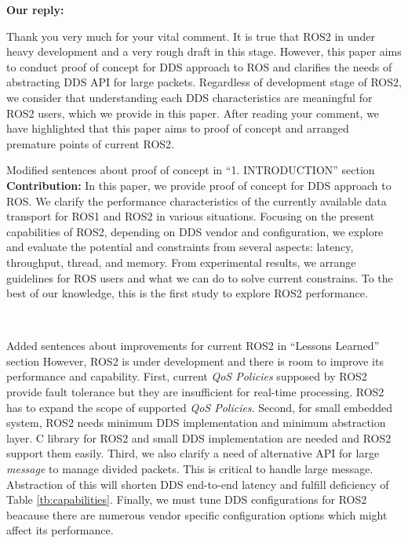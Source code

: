 \documentclass{article}
\begin{document}
\begin{itemize}
  \begin{flushleft}
    \textbf{Our reply:}
  \end{flushleft}
  Thank you very much for your vital comment.
  It is true that ROS2 in under heavy development and a very rough draft in this stage.
  However, this paper aims to conduct proof of concept for DDS approach to ROS and clarifies the needs of abstracting DDS API for large packets.
  Regardless of development stage of ROS2, we consider that understanding each DDS characteristics are meaningful for ROS2 users, which we provide in this paper.
  After reading your comment, we have highlighted that this paper aims to proof of concept and arranged premature points of current ROS2.
  \begin{itembox}[|]{Modified sentences about proof of concept in ``1. INTRODUCTION'' section}
    \textbf{Contribution:}
    In this paper, we provide proof of concept for DDS approach to ROS.
    We clarify the performance characteristics of the currently available data transport for ROS1 and ROS2 in various situations.
    Focusing on the present capabilities of ROS2, depending on DDS vendor and configuration, we explore and evaluate the potential and constraints from several aspects: latency, throughput, thread, and memory.
    From experimental results, we arrange guidelines for ROS users and what we can do to solve current constrains.
    To the best of our knowledge, this is the first study to explore ROS2 performance.
  \end{itembox}\\
  \begin{itembox}[|]{Added sentences about improvements for current ROS2 in ``Lessons Learned'' section}
    However, ROS2 is under development and there is room to improve its performance and capability.
    First, current \emph{QoS Policies} supposed by ROS2 provide fault tolerance but they are insufficient for real-time processing.
    ROS2 has to expand the scope of supported \emph{QoS Policies}.
    Second, for small embedded system, ROS2 needs minimum DDS implementation and minimum abstraction layer.
    C library for ROS2 and small DDS implementation are needed and ROS2 support them easily.
    Third, we also clarify a need of alternative API for large \emph{message} to manage divided packets.
    This is critical to handle large message.
    Abstraction of this will shorten DDS end-to-end latency and fulfill deficiency of Table \ref{tb:capabilities}.
    Finally, we must tune DDS configurations for ROS2 beacause there are numerous vendor specific configuration options which might affect its performance.
  \end{itembox}\\

\end{itemize}
\end{document}
